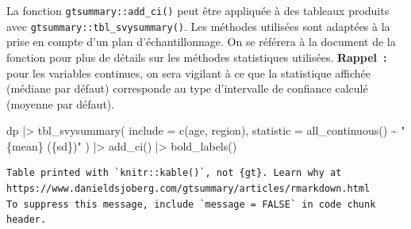 \documentclass[
  letterpaper,
  DIV=11,
  numbers=noendperiod,
  oneside]{scrreprt}
\newenvironment{Shaded}{\begin{snugshade}}{\end{snugshade}}
\newcommand{\AttributeTok}[1]{\textcolor[rgb]{0.40,0.45,0.13}{#1}}
\newcommand{\FunctionTok}[1]{\textcolor[rgb]{0.28,0.35,0.67}{#1}}
\newcommand{\NormalTok}[1]{\textcolor[rgb]{0.00,0.23,0.31}{#1}}
\newcommand{\SpecialCharTok}[1]{\textcolor[rgb]{0.37,0.37,0.37}{#1}}
\newcommand{\StringTok}[1]{\textcolor[rgb]{0.13,0.47,0.30}{#1}}
\begin{document}
La fonction \texttt{gtsummary::add\_ci()} peut être appliquée à des
tableaux produits avec \texttt{gtsummary::tbl\_svysummary()}. Les
méthodes utilisées sont adaptées à la prise en compte d'un plan
d'échantillonnage. On se référera à la document de la fonction pour plus
de détails sur les méthodes statistiques utilisées. \textbf{Rappel~:}
pour les variables continues, on sera vigilant à ce que la statistique
affichée (médiane par défaut) corresponde au type d'intervalle de
confiance calculé (moyenne par défaut).

\begin{Shaded}
\begin{Highlighting}[]
\NormalTok{dp }\SpecialCharTok{|\textgreater{}} 
  \FunctionTok{tbl\_svysummary}\NormalTok{(}
    \AttributeTok{include =} \FunctionTok{c}\NormalTok{(age, region),}
    \AttributeTok{statistic =} \FunctionTok{all\_continuous}\NormalTok{() }\SpecialCharTok{\textasciitilde{}} \StringTok{"\{mean\} (\{sd\})"}
\NormalTok{  ) }\SpecialCharTok{|\textgreater{}} 
  \FunctionTok{add\_ci}\NormalTok{() }\SpecialCharTok{|\textgreater{}} 
  \FunctionTok{bold\_labels}\NormalTok{()}
\end{Highlighting}
\end{Shaded}

\begin{verbatim}
Table printed with `knitr::kable()`, not {gt}. Learn why at
https://www.danieldsjoberg.com/gtsummary/articles/rmarkdown.html
To suppress this message, include `message = FALSE` in code chunk header.
\end{verbatim}
\end{document}
